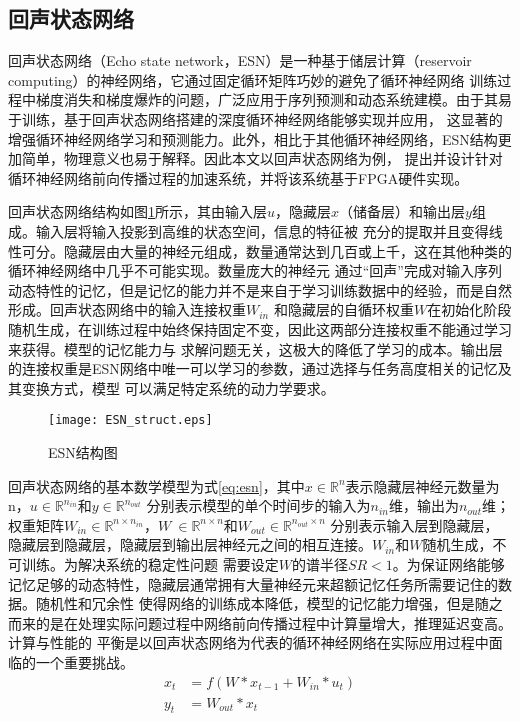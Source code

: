 \subsection{回声状态网络}
回声状态网络（Echo state network，ESN）是一种基于储层计算（reservoir computing）的神经网络，它通过固定循环矩阵巧妙的避免了循环神经网络
训练过程中梯度消失和梯度爆炸的问题，广泛应用于序列预测和动态系统建模。由于其易于训练，基于回声状态网络搭建的深度循环神经网络能够实现并应用，
这显著的增强循环神经网络学习和预测能力。此外，相比于其他循环神经网络，ESN结构更加简单，物理意义也易于解释。因此本文以回声状态网络为例，
提出并设计针对循环神经网络前向传播过程的加速系统，并将该系统基于FPGA硬件实现。

回声状态网络结构如图\ref{fig:esn}所示，其由输入层\(u\)，隐藏层\(x\)（储备层）和输出层\(y\)组成。输入层将输入投影到高维的状态空间，信息的特征被
充分的提取并且变得线性可分。隐藏层由大量的神经元组成，数量通常达到几百或上千，这在其他种类的循环神经网络中几乎不可能实现。数量庞大的神经元
通过“回声”完成对输入序列动态特性的记忆，但是记忆的能力并不是来自于学习训练数据中的经验，而是自然形成。回声状态网络中的输入连接权重\(W_{in}\)
和隐藏层的自循环权重\(W\)在初始化阶段随机生成，在训练过程中始终保持固定不变，因此这两部分连接权重不能通过学习来获得。模型的记忆能力与
求解问题无关，这极大的降低了学习的成本。输出层的连接权重是ESN网络中唯一可以学习的参数，通过选择与任务高度相关的记忆及其变换方式，模型
可以满足特定系统的动力学要求。

\begin{figure}
	\centering
	\texttt{[image: ESN\_struct.eps]}
	\caption{ESN结构图}
	\label{fig:esn}
\end{figure}

回声状态网络的基本数学模型为式\ref{eq:esn}，其中\(x\in \mathbb{R}^n\)表示隐藏层神经元数量为n，\(u \in \mathbb{R}^{n_{in}}\)和\(y \in \mathbb{R}^{n_{out}}\)
分别表示模型的单个时间步的输入为\(n_{in}\)维，输出为\(n_{out}\)维；权重矩阵\(W_{in} \in \mathbb{R}^{n \times n_{in}}\)，\(W\ \in \mathbb{R}^{n \times n}\)和\(W_{out} \in \mathbb{R}^{n_{out} \times n}\)
分别表示输入层到隐藏层，隐藏层到隐藏层，隐藏层到输出层神经元之间的相互连接。\(W_{in}\)和\(W\)随机生成，不可训练。为解决系统的稳定性问题
需要设定\(W\)的谱半径\(SR < 1\)。为保证网络能够记忆足够的动态特性，隐藏层通常拥有大量神经元来超额记忆任务所需要记住的数据。随机性和冗余性
使得网络的训练成本降低，模型的记忆能力增强，但是随之而来的是在处理实际问题过程中网络前向传播过程中计算量增大，推理延迟变高。计算与性能的
平衡是以回声状态网络为代表的循环神经网络在实际应用过程中面临的一个重要挑战。
\begin{equation}\label{eq:esn}
	\begin{split}
		x_{t} &= f(W*x_{t-1} + W_{in}*u_{t})	\\
		y_{t} &= W_{out}*x_{t}				
	\end{split}
\end{equation}

